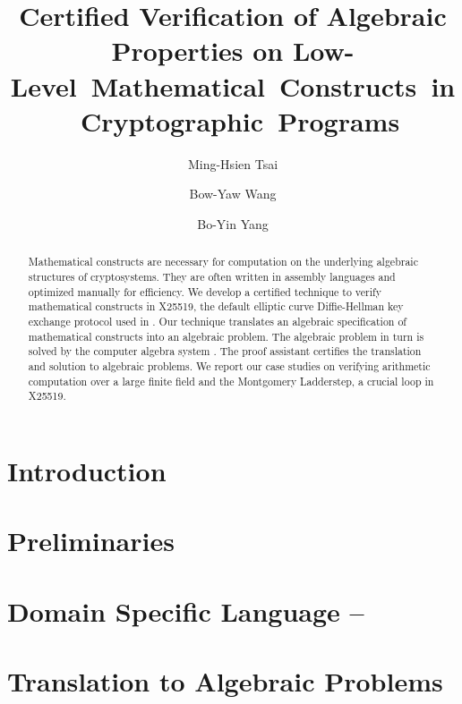 \documentclass[sigconf,authordraft]{acmart}
\title{Certified Verification of Algebraic Properties on
Low- \mbox{Level Mathematical Constructs in Cryptographic Programs}}
\author{Ming-Hsien Tsai}
\affiliation{
  \institution{Academia Sinica}
  \streetaddress{Taipei, Taiwan}
}
\author{Bow-Yaw Wang}
\affiliation{
  \institution{Academia Sinica}
  \streetaddress{Taipei, Taiwan}
}
\author{Bo-Yin Yang}
\affiliation{
  \institution{Academia Sinica}
  \streetaddress{Taipei, Taiwan}
}
\author{\vspace*{-1.2cm}}
\affiliation{\vspace*{-1.2cm}\ }
\begin{document}
\maketitle

\begin{abstract}
  Mathematical constructs are necessary for computation on the
  underlying algebraic structures of cryptosystems. They are often
  written in assembly languages and optimized manually for
  efficiency. We develop a certified technique to verify mathematical
  constructs in X25519, the default elliptic curve Diffie-Hellman key
  exchange protocol used in \openssh. Our technique translates an
  algebraic specification of mathematical constructs into an algebraic
  problem. The algebraic 
  problem in turn is solved by the computer algebra system \singular. 
  The proof assistant 
  \coq certifies the translation and solution to algebraic
  problems. We report our case studies on verifying
  arithmetic computation over a large finite field and
  the Montgomery Ladderstep, a crucial loop  in X25519.
\end{abstract}

\vspace{-.5em}
\section{Introduction}
\vspace{-.5em}
\label{section:introduction}


\vspace{-.5em}
\section{Preliminaries}
\vspace{-.5em}
\label{section:preliminaries}


\vspace{-.5em}
\section{Domain Specific Language -- \mydsl}
\vspace{-.5em}
\label{section:domain-specific-language}


\vspace{-.5em}
\section{Translation to Algebraic Problems}
\vspace{-.5em}
\label{section:translation}

\end{document}
